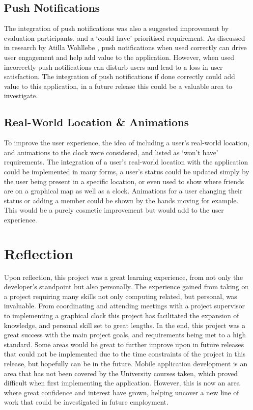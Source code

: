 \subsection*{Push Notifications}
The integration of push notifications was also a suggested improvement by evaluation participants, and a `could have' prioritised requirement. As discussed in research by Atilla Wohllebe \cite{pushNoti}, push notifications when used correctly can drive user engagement and help add value to the application. However, when used incorrectly push notifications can disturb users and lead to a loss in user satisfaction. The integration of push notifications if done correctly could add value to this application, in a future release this could be a valuable area to investigate.

\subsection*{Real-World Location \& Animations}
To improve the user experience, the idea of including a user's real-world location, and animations to the clock were considered, and listed as `won't have' requirements. The integration of a user's real-world location with the application could be implemented in many forms, a user's status could be updated simply by the user being present in a specific location, or even used to show where friends are on a graphical map as well as a clock. Animations for a user changing their status or adding a member could be shown by the hands moving for example. This would be a purely cosmetic improvement but would add to the user experience.

\section{Reflection}

Upon reflection, this project was a great learning experience, from not only the developer's standpoint but also personally. The experience gained from taking on a project requiring many skills not only computing related, but personal, was invaluable. From coordinating and attending meetings with a project supervisor to implementing a graphical clock this project has facilitated the expansion of knowledge, and personal skill set to great lengths. In the end, this project was a great success with the main project goals, and requirements being met to a high standard. Some areas would be great to further improve upon in future releases that could not be implemented due to the time constraints of the project in this release, but hopefully can be in the future. Mobile application development is an area that has not been covered by the University courses taken, which proved difficult when first implementing the application. However, this is now an area where great confidence and interest have grown, helping uncover a new line of work that could be investigated in future employment.  
